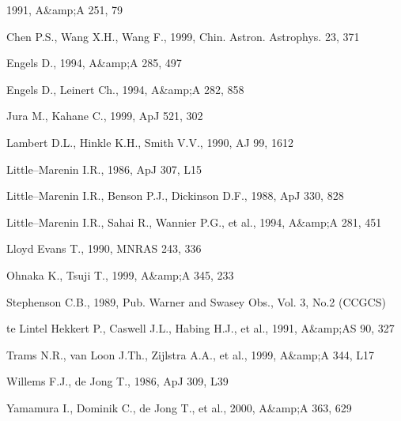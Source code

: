 {{{{{{{{{{{{{{%
              1991, A&amp;A 251, 79

 Chen P.S., Wang X.H., Wang F., 1999,
              Chin. Astron. Astrophys. 23, 371

 Engels D., 1994, A&amp;A 285, 497

 Engels D., Leinert Ch., 1994, A&amp;A 282, 858

 Jura M., Kahane C., 1999, ApJ 521, 302

 Lambert D.L., Hinkle K.H., Smith V.V.,
               1990, AJ 99, 1612

 Little--Marenin I.R., 1986, ApJ 307, L15

 Little--Marenin I.R., Benson P.J., Dickinson
              D.F., 1988, ApJ 330, 828

 Little--Marenin I.R., Sahai R., Wannier P.G.,
              et al., 1994, A&amp;A 281, 451

 Lloyd Evans T., 1990, MNRAS 243, 336

 Ohnaka K., Tsuji T., 1999, A&amp;A 345, 233

 Stephenson C.B., 1989, Pub. Warner and Swasey
               Obs., Vol. 3, No.2 (CCGCS)

 te Lintel Hekkert P., Caswell J.L.,
               Habing H.J., et al., 1991, A&amp;AS 90, 327

 Trams N.R., van Loon J.Th., Zijlstra A.A., et al.,
              1999, A&amp;A 344, L17

 Willems F.J., de Jong T., 1986, ApJ 309, L39

 Yamamura I., Dominik C., de Jong T., et al.,
               2000, A&amp;A 363, 629


}}}}}}}}}}}}}}
